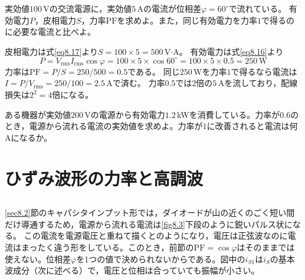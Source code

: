 \begin{例題}[平均電力と力率]
\label{rei8.2}
実効値$100$\,Vの交流電源に，実効値$5$\,Aの電流が位相差$\varphi = 60^\circ$で流れている。
有効電力$P$，皮相電力$S$，力率$\mathrm{PF}$を求めよ。また，同じ有効電力を力率$1$で得るのに必要な電流と比べよ。
\begin{解答}
皮相電力は式\ref{eq8.17}より$S = 100\times5 = 500$\,V$\cdot$A。
有効電力は式\ref{eq8.16}より
\begin{equation*}
P = V_{\mathrm{rms}} I_{\mathrm{rms}}\cos\varphi = 100\times5\times\cos60^\circ = 100\times5\times0.5 = 250\,\mathrm{W}
\end{equation*}
力率は$\mathrm{PF} = P/S = 250/500 = 0.5$である。
同じ$250$\,Wを力率$1$で得るなら電流は$I = P/V_{\mathrm{rms}} = 250/100 = 2.5$\,Aで済む。
力率$0.5$では$2$倍の$5$\,Aを流しており，配線損失は$2^2 = 4$倍になる。
\end{解答}
\end{例題}

\begin{問}
\item ある機器が実効値$200$\,Vの電源から有効電力$1.2$\,kWを消費している。力率が$0.6$のとき，電源から流れる電流の実効値を求めよ。力率が$1$に改善されると電流は何\,Aになるか。
\end{問}


\section{ひずみ波形の力率と高調波}
\label{sec8.4}

\subsection{}

\ref{sec8.2}節のキャパシタインプット形では，ダイオードが山の近くのごく短い間だけ導通するため，電源から流れる電流は\ref{fig8.3}下段のように鋭いパルス状になる。
この電流を電源電圧と重ねて描くとのようになり，電圧は正弦波なのに電流はまったく違う形をしている。このとき，前節の$\mathrm{PF} = \cos\varphi$はそのままでは使えない。位相差$\varphi$を1つの値で決められないからである。図中の$i_{S1}$は$i_S$の基本波成分（次に述べる）で，電圧と位相は合っていても振幅が小さい。

